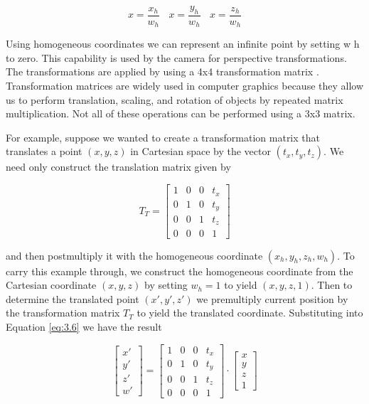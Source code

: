\begin{equation}\label{eq:3.5}
x = \frac{x_h}{w_h}\ \ \ \  x = \frac{y_h}{w_h}\ \ \ \ x = \frac{z_h}{w_h}
\end{equation}

Using homogeneous coordinates we can represent an infinite point by setting w h to zero. This capability is used by the camera for perspective transformations. The transformations are applied by using a 4x4 transformation matrix . Transformation matrices are widely used in computer graphics because they allow us to perform translation, scaling, and rotation of objects by repeated matrix multiplication. Not all of these operations can be performed using a 3x3 matrix.

For example, suppose we wanted to create a transformation matrix that translates a point $( x, y, z)$ in Cartesian space by the vector $( t_x , t_y, t_z)$. We need only construct the translation matrix given by

\begin{equation}\label{eq:3.6}
T_T = \left[\begin{array}{cccc}
1 & 0 & 0 & t_x       \\
0 & 1 & 0 & t_y      \\
0 & 0 & 1 & t_z      \\
0 & 0 & 0 & 1
\end{array}\right]
\end{equation}

and then postmultiply it with the homogeneous coordinate $(x_h, y_h, z_h, w_h)$. To carry this example through, we construct the homogeneous coordinate from the Cartesian coordinate $( x, y, z)$ by setting $w_h = 1$ to yield $(x, y, z, 1)$. Then to determine the translated point $(x' , y', z')$ we premultiply current position by the transformation matrix $T_T$ to yield the translated coordinate. Substituting into Equation \ref{eq:3.6} we have the result

\begin{equation}\label{eq:3.7}
\left[\begin{array}{c}
x'      \\
y'       \\
z'      \\
w'
\end{array}\right] =\left[\begin{array}{cccc}
1 & 0 & 0 & t_x       \\
0 & 1 & 0 & t_y       \\
0 & 0 & 1 & t_z      \\
0 & 0 & 0 & 1
\end{array}\right] \cdot
\left[\begin{array}{c}
x      \\
y       \\
z      \\
1
\end{array}\right] 
\end{equation}

